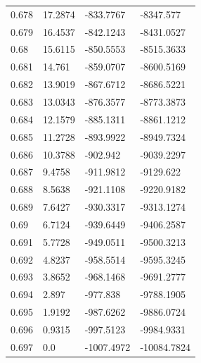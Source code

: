\begin{tabular}{llll}
0.678 & 17.2874 & -833.7767 & -8347.577 \\
0.679 & 16.4537 & -842.1243 & -8431.0527 \\
0.68 & 15.6115 & -850.5553 & -8515.3633 \\
0.681 & 14.761 & -859.0707 & -8600.5169 \\
0.682 & 13.9019 & -867.6712 & -8686.5221 \\
0.683 & 13.0343 & -876.3577 & -8773.3873 \\
0.684 & 12.1579 & -885.1311 & -8861.1212 \\
0.685 & 11.2728 & -893.9922 & -8949.7324 \\
0.686 & 10.3788 & -902.942 & -9039.2297 \\
0.687 & 9.4758 & -911.9812 & -9129.622 \\
0.688 & 8.5638 & -921.1108 & -9220.9182 \\
0.689 & 7.6427 & -930.3317 & -9313.1274 \\
0.69 & 6.7124 & -939.6449 & -9406.2587 \\
0.691 & 5.7728 & -949.0511 & -9500.3213 \\
0.692 & 4.8237 & -958.5514 & -9595.3245 \\
0.693 & 3.8652 & -968.1468 & -9691.2777 \\
0.694 & 2.897 & -977.838 & -9788.1905 \\
0.695 & 1.9192 & -987.6262 & -9886.0724 \\
0.696 & 0.9315 & -997.5123 & -9984.9331 \\
0.697 & 0.0 & -1007.4972 & -10084.7824 \\
\bottomrule
\end{tabular}
